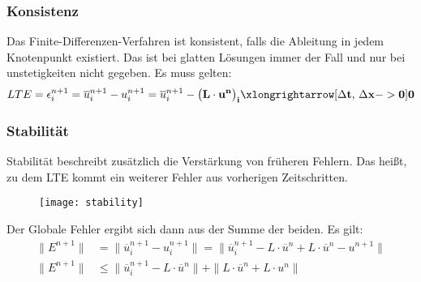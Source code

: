 \subsubsection{Konsistenz}
Das Finite-Differenzen-Verfahren ist konsistent, falls die Ableitung in jedem Knotenpunkt existiert. Das ist bei glatten L\"osungen immer der Fall und nur bei unstetigkeiten nicht gegeben. Es muss gelten:
\begin{equation*}
	LTE = \epsilon^{n+1}_i = \overline{u}^{n+1}_i - u^{n+1}_i = \overline{u}^{n+1}_i - \bf{\big(L\cdot u^n\big)_i} \xlongrightarrow[\text{$\Delta$} t \text{, $\Delta$}x -> 0]{} 0
\end{equation*}


\subsubsection{Stabilit\"at}
Stabilit\"at beschreibt zus\"atzlich die Verst\"arkung von fr\"uheren Fehlern. Das hei\ss{}t, zu dem LTE kommt ein weiterer Fehler aus vorherigen Zeitschritten.
\par
\begin{figure}[ht]
	\centering
	\texttt{[image: stability]}
\end{figure}
Der Globale Fehler ergibt sich dann aus der Summe der beiden. Es gilt:
\begin{align*}
	\|E^{n+1}\| &= \|\overline{u}^{n+1}_i - u^{n+1}_i\| = \|\overline{u}^{n+1}_i - L\cdot \overline{u}^n + L\cdot \overline{u}^n - u^{n+1}\| \\
	\|E^{n+1}\| &\leq \|\overline{u}^{n+1}_i - L\cdot \overline{u}^n\| + \|L\cdot \overline{u}^n + L\cdot u^n\|
\end{align*}
\par
\vspace{-2em}

